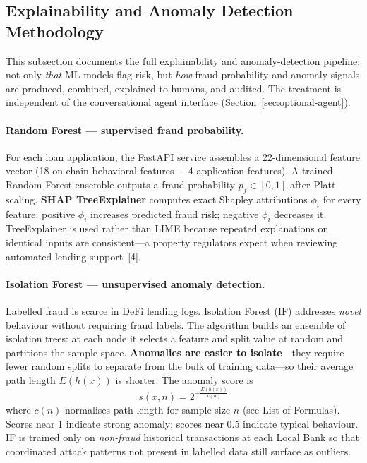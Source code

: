 \documentclass[12pt,a4paper]{report}
\begin{document}
\subsection{Explainability and Anomaly Detection Methodology}
\label{sec:ml-explainability}

This subsection documents the full explainability and anomaly-detection pipeline: not only \textit{that} ML models flag risk, but \textit{how} fraud probability and anomaly signals are produced, combined, explained to humans, and audited. The treatment is independent of the conversational agent interface (Section~\ref{sec:optional-agent}).

\paragraph{Random Forest --- supervised fraud probability.}
For each loan application, the FastAPI service assembles a 22-dimensional feature vector (18 on-chain behavioral features + 4 application features). A trained Random Forest ensemble outputs a fraud probability $p_f \in [0,1]$ after Platt scaling. \textbf{SHAP TreeExplainer} computes exact Shapley attributions $\phi_i$ for every feature: positive $\phi_i$ increases predicted fraud risk; negative $\phi_i$ decreases it. TreeExplainer is used rather than LIME because repeated explanations on identical inputs are consistent---a property regulators expect when reviewing automated lending support~[4].

\paragraph{Isolation Forest --- unsupervised anomaly detection.}
Labelled fraud is scarce in DeFi lending logs. Isolation Forest (IF) addresses \textit{novel} behaviour without requiring fraud labels. The algorithm builds an ensemble of isolation trees: at each node it selects a feature and split value at random and partitions the sample space. \textbf{Anomalies are easier to isolate}---they require fewer random splits to separate from the bulk of training data---so their average path length $E(h(x))$ is shorter. The anomaly score is
\[
s(x,n) = 2^{-\frac{E(h(x))}{c(n)}}
\]
where $c(n)$ normalises path length for sample size $n$ (see List of Formulas). Scores near 1 indicate strong anomaly; scores near 0.5 indicate typical behaviour. IF is trained only on \textit{non-fraud} historical transactions at each Local Bank so that coordinated attack patterns not present in labelled data still surface as outliers.
\end{document}
